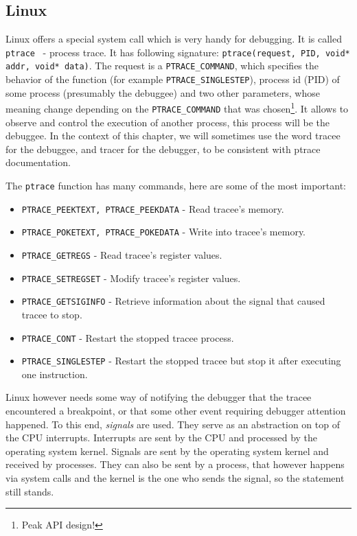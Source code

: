 \subsection{Linux}\label{section:linux-dbg}
Linux offers a special system call which is very handy for debugging. It is
called \texttt{ptrace}~\cite{ptrace} - process trace. It has following
signature: \texttt{ptrace(request, PID, void* addr, void* data)}. The request
is a \texttt{PTRACE\_COMMAND}, which specifies the behavior of the function
(for example \texttt{PTRACE\_SINGLESTEP}), process id (PID) of some process
(presumably the debuggee) and two other parameters, whose meaning change
depending on the \texttt{PTRACE\_COMMAND} that was chosen\footnote{Peak API
design!}. It allows to observe and control the execution of another process,
this process will be the debuggee. In the context of this chapter, we will
sometimes use the word tracee for the debuggee, and tracer for the debugger, to
be consistent with ptrace documentation.

The \texttt{ptrace} function has many commands, here are some of the most important:
\begin{itemize}
    \item \texttt{PTRACE\_PEEKTEXT, PTRACE\_PEEKDATA} - Read tracee's memory.
    \item \texttt{PTRACE\_POKETEXT, PTRACE\_POKEDATA} - Write into tracee's
          memory.
    \item \texttt{PTRACE\_GETREGS} - Read tracee's register values.
    \item \texttt{PTRACE\_SETREGSET} - Modify tracee's register values.
    \item \texttt{PTRACE\_GETSIGINFO} - Retrieve information about the signal
                                        that caused tracee to stop.
    \item \texttt{PTRACE\_CONT} - Restart the stopped tracee process.
    \item \texttt{PTRACE\_SINGLESTEP} - Restart the stopped tracee but
          stop it after executing one instruction.
\end{itemize}

Linux however needs some way of notifying the debugger that the tracee
encountered a breakpoint, or that some other event requiring debugger attention
happened. To this end, \textit{signals} are used. They serve as an abstraction
on top of the CPU interrupts. Interrupts are sent by the CPU and processed by
the operating system kernel. Signals are sent by the operating system kernel
and received by processes. They can also be sent by a process, that however
happens via system calls and the kernel is the one who sends the signal, so the
statement still stands.

